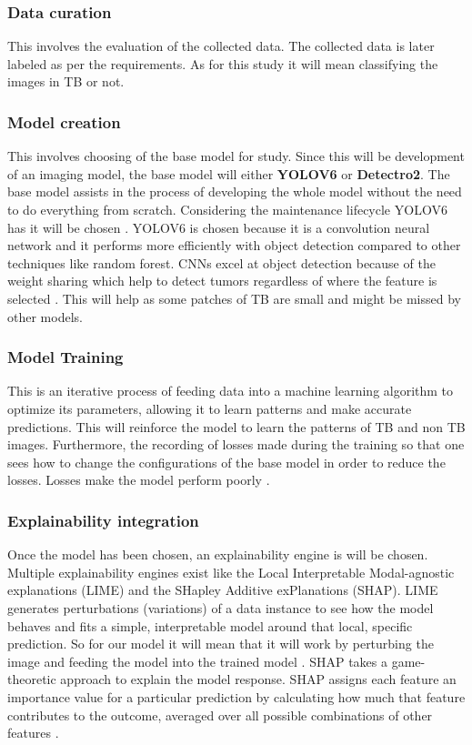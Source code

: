\documentclass[12pt,a4paper]{article}
\begin{document}
\subsubsection{Data curation}
This involves the evaluation of the collected data. The collected data is later labeled as per the requirements. As for this study it will mean classifying the images in TB or not. 

\subsubsection{Model creation}
This involves choosing of the base model for study. Since this will be development of an imaging model, the base model will either \textbf{YOLOV6} or \textbf{Detectro2}. The base model assists in the process of developing the whole model without the need to do everything from scratch. Considering the maintenance lifecycle YOLOV6 has it will be chosen \citep{Li2022}. YOLOV6 is chosen because it is a convolution neural network and it performs more efficiently with object detection compared to other techniques like random forest. CNNs excel at object detection because of the weight sharing which help to detect tumors regardless of where the feature is selected \citep{Li2022}. This will help as some patches of TB are small and might be missed by other models.

\subsubsection{Model Training}
This is an iterative process of feeding data into a machine learning algorithm to optimize its parameters, allowing it to learn patterns and make accurate predictions. This will reinforce the model to learn the patterns of TB and non TB images. Furthermore, the recording of losses made during the training so that one sees how to change the configurations of the base model in order to reduce the losses. Losses make the model perform poorly \citep{Kumar2025}.

\subsubsection{Explainability integration}
Once the model has been chosen, an explainability engine is will be chosen. Multiple explainability engines exist like the Local Interpretable Modal-agnostic explanations (LIME) and the SHapley Additive exPlanations (SHAP). LIME generates perturbations (variations) of a data instance to see how the model behaves and fits a simple, interpretable model around that local, specific prediction. So for our model it will mean that it will work by perturbing the image and feeding the model into the trained model \citep{Ribeiro2016}.
SHAP takes a game-theoretic approach to explain the model response. SHAP assigns each feature an importance value for a particular prediction by calculating how much that feature contributes to the outcome, averaged over all possible combinations of other features \citep{Lundberg2017}. 
\end{document}
